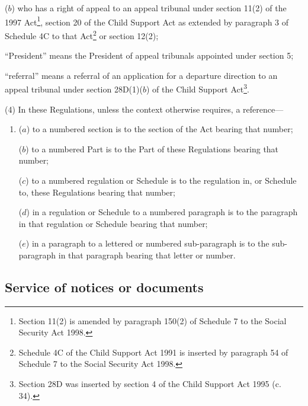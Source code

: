 \documentclass[12pt,a4paper]{article}
\begin{document}
\begin{enumerate}
\begin{enumerate}
($b$) who has a right of appeal to an appeal tribunal under section 11(2) of the 1997 Act\footnote{\frenchspacing Section 11(2) is amended by paragraph 150(2) of Schedule 7 to the Social Security Act 1998.}, section 20 of the Child Support Act as extended by paragraph 3 of Schedule 4C to that Act\footnote{\frenchspacing Schedule 4C of the Child Support Act 1991 is inserted by paragraph 54 of Schedule 7 to the Social Security Act 1998.} or section 12(2);
\end{enumerate}

“President” means the President of appeal tribunals appointed under section 5;

“referral” means a referral of an application for a departure direction to an appeal tribunal under section 28D(1)($b$) of the Child Support Act\footnote{\frenchspacing Section 28D was inserted by section 4 of the Child Support Act 1995 (c. 34).}.
\end{enumerate}

(4) In these Regulations, unless the context otherwise requires, a reference—
\begin{enumerate}\item[]
($a$) to a numbered section is to the section of the Act bearing that number;

($b$) to a numbered Part is to the Part of these Regulations bearing that number;

($c$) to a numbered regulation or Schedule is to the regulation in, or Schedule to, these Regulations bearing that number;

($d$) in a regulation or Schedule to a numbered paragraph is to the paragraph in that regulation or Schedule bearing that number;

($e$) in a paragraph to a lettered or numbered sub-paragraph is to the sub-paragraph in that paragraph bearing that letter or number.
\end{enumerate}

\subsection[2. Service of notices or documents]{Service of notices or documents}
\end{document}
